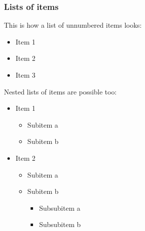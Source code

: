 \documentclass[aspectratio=169]{beamer}
\begin{document}
\begin{frame}
    \frametitle{Lists of items}
    This is how a list of unnumbered items looks:
    \begin{itemize}
        \item Item 1
        \item Item 2
        \item Item 3
    \end{itemize}
    \vspace{.25cm}
    Nested lists of items are possible too:
    \begin{itemize}
        \item Item 1
            \begin{itemize}
                \item Subitem a
                \item Subitem b
            \end{itemize}
        \item Item 2
            \begin{itemize}
                \item Subitem a
                \item Subitem b
                    \begin{itemize}
                        \item Subsubitem a
                        \item Subsubitem b
                    \end{itemize}
            \end{itemize}
    \end{itemize}
\end{frame}
\end{document}
